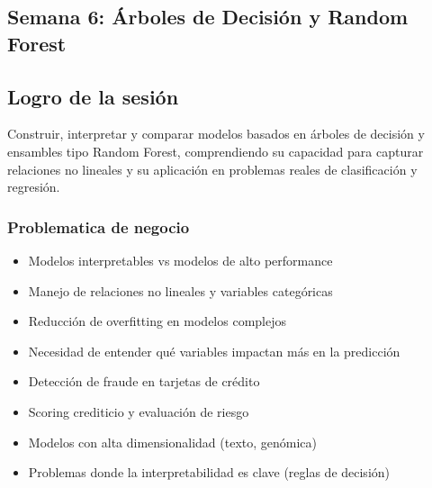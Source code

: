 \documentclass[12pt,a4paper,openany,oneside]{book}
\begin{document}
\begin{itemize}
\chapter{Semana 6: Árboles de Decisión y Random Forest}

\section{Logro de la sesión}
Construir, interpretar y comparar modelos basados en árboles de decisión y ensambles tipo Random Forest, comprendiendo su capacidad para capturar relaciones no lineales y su aplicación en problemas reales de clasificación y regresión.

\subsection{Problematica de negocio}
\begin{itemize}
    \item Modelos interpretables vs modelos de alto performance
    \item Manejo de relaciones no lineales y variables categóricas
    \item Reducción de overfitting en modelos complejos
    \item Necesidad de entender qué variables impactan más en la predicción
    \item Detección de fraude en tarjetas de crédito
    \item Scoring crediticio y evaluación de riesgo
    \item Modelos con alta dimensionalidad (texto, genómica)
    \item Problemas donde la interpretabilidad es clave (reglas de decisión)
\end{itemize}


\end{itemize}
\end{document}
